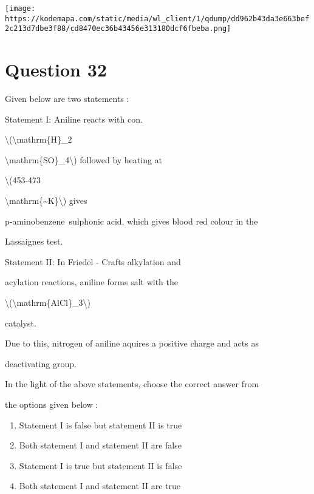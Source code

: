 \documentclass{article}
\begin{document}
\texttt{[image: https://kodemapa.com/static/media/wl\_client/1/qdump/dd962b43da3e663bef2c213d7dbe3f88/cd8470ec36b43456e313180dcf6fbeba.png]}\\



\hfill\break


\begin{enumerate}[label=(\alph*)]
\end{enumerate}
\newpage
\section*{Question 32}
Given below are two statements :



Statement I: Aniline reacts with con.

\textbackslash(\textbackslash mathrm\{H\}\_2

\textbackslash mathrm\{SO\}\_4\textbackslash) followed by heating at

\textbackslash(453-473

\textbackslash mathrm\{\textasciitilde K\}\textbackslash) gives

p-aminobenzene~sulphonic acid, which gives blood red colour in the

\textquotesingle Lassaigne\textquotesingle s test\textquotesingle.\\

{Statement II: In Friedel - Craft\textquotesingle s alkylation and

acylation reactions, aniline forms salt with the

\textbackslash(\textbackslash mathrm\{AlCl\}\_3\textbackslash)

catalyst.\\

}{Due to this, nitrogen of aniline aquires a positive charge and acts as

deactivating group.\\

}{In the light of the above statements, choose the correct answer from

the options given below :}


\begin{enumerate}[label=(\alph*)]
\item Statement I is false but statement II is true


\item Both statement I and statement II are false


\item Statement I is true but statement II is false


\item Both statement I and statement II are true


\end{enumerate}
\newpage
\end{document}
